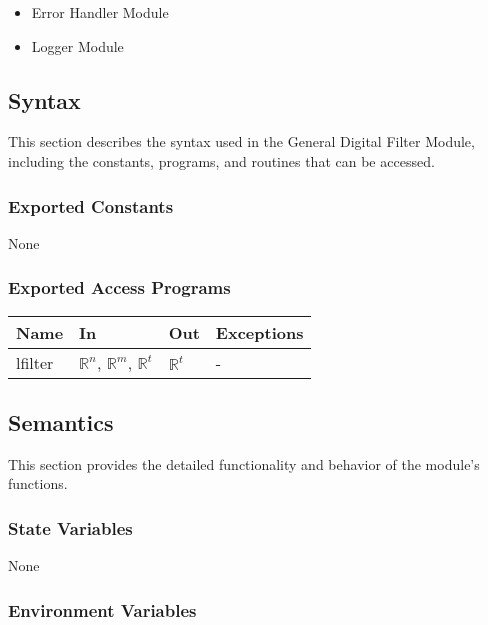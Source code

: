 \documentclass[12pt, titlepage]{article}
\begin{document}
\begin{itemize}
\item Error Handler Module
\item Logger Module
\end{itemize}

\subsection{Syntax}

This section describes the syntax used in the General Digital Filter Module,
including the constants, programs, and routines that can be accessed.

\subsubsection{Exported Constants}

None

\subsubsection{Exported Access Programs}

\begin{center}
\begin{tabular}{p{2cm} p{4cm} p{4cm} p{2cm}}
\hline
\textbf{Name} & \textbf{In} & \textbf{Out} & \textbf{Exceptions} \\
\hline
lfilter & $\mathbb{R}^n$, $\mathbb{R}^m$, $\mathbb{R}^t$ & $\mathbb{R}^t$ & - \\
\hline
\end{tabular}
\end{center}

\subsection{Semantics}

This section provides the detailed functionality and behavior of the module’s
functions.

\subsubsection{State Variables}

None

\subsubsection{Environment Variables}
\end{document}
